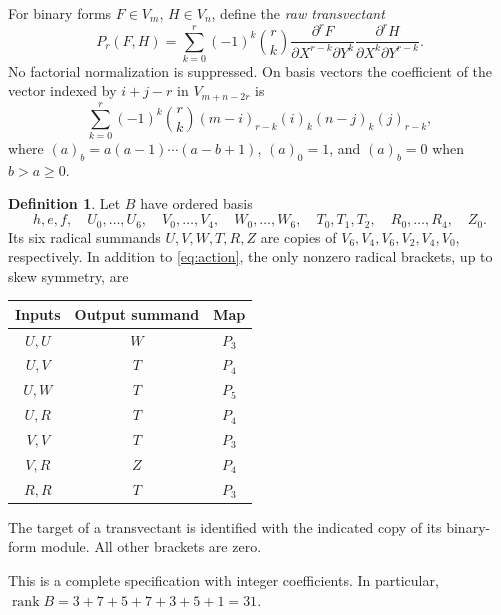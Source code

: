 \documentclass[11pt]{article}
\theoremstyle{definition}\newtheorem{definition}[theorem]{Definition}
\theoremstyle{remark}\newtheorem{remark}[theorem]{Remark}
\DeclareMathOperator{\rank}{rank}
\begin{document}
For binary forms $F\in V_m$, $H\in V_n$, define the \emph{raw transvectant}
\begin{equation}\label{eq:transvectant}
 P_r(F,H)=\sum_{k=0}^r(-1)^k\binom rk
 \frac{\partial^r F}{\partial X^{r-k}\partial Y^k}
 \frac{\partial^r H}{\partial X^k\partial Y^{r-k}}.
\end{equation}
No factorial normalization is suppressed. On basis vectors the coefficient
of the vector indexed by $i+j-r$ in $V_{m+n-2r}$ is
\begin{equation}\label{eq:falling}
 \sum_{k=0}^r(-1)^k\binom rk
 (m-i)_{r-k}(i)_k(n-j)_k(j)_{r-k},
\end{equation}
where $(a)_b=a(a-1)\cdots(a-b+1)$, $(a)_0=1$, and $(a)_b=0$ when $b>a\ge0$.

\begin{definition}\label{def:B}
Let $B$ have ordered basis
\[
 h,e,f,\quad U_0,\ldots,U_6,\quad V_0,\ldots,V_4,\quad
 W_0,\ldots,W_6,\quad T_0,T_1,T_2,\quad R_0,\ldots,R_4,\quad Z_0.
\]
Its six radical summands $U,V,W,T,R,Z$ are copies of
$V_6,V_4,V_6,V_2,V_4,V_0$, respectively. In addition to
\eqref{eq:action}, the only nonzero radical brackets, up to skew symmetry, are
\begin{center}
\begin{tabular}{ccc}
\toprule Inputs & Output summand & Map \\ \midrule
$U,U$ & $W$ & $P_3$ \\
$U,V$ & $T$ & $P_4$ \\
$U,W$ & $T$ & $P_5$ \\
$U,R$ & $T$ & $P_4$ \\
$V,V$ & $T$ & $P_3$ \\
$V,R$ & $Z$ & $P_4$ \\
$R,R$ & $T$ & $P_3$ \\
\bottomrule
\end{tabular}
\end{center}
The target of a transvectant is identified with the indicated copy of its
binary-form module. All other brackets are zero.
\end{definition}
This is a complete specification with integer coefficients. In particular,
$\rank B=3+7+5+7+3+5+1=31$.
\end{document}

